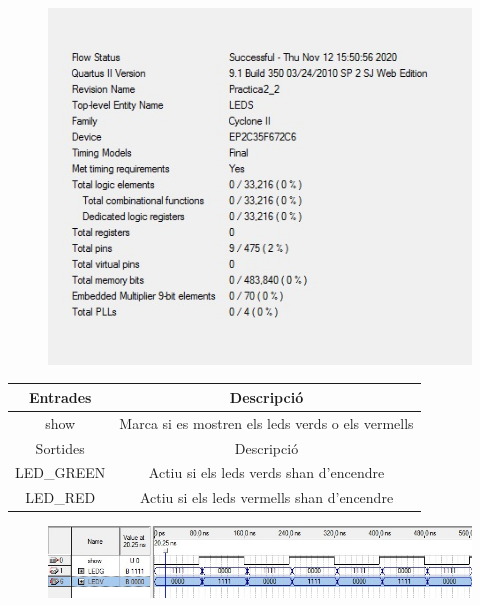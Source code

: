 \documentclass[12pt, a4papre]{article}
\begin{document}
\begin{figure}[H]
		\begin{center}
		\includegraphics[width=130mm]{informeLEDS.jpeg}
		\end{center}
	\end{figure}
	
		\begin{table}[H]
		\centering
		 \begin{tabular}{|c | c|} 
			 \hline
			 Entrades & Descripció\\ [0.5ex] 
			 \hline
			 show & Marca si es mostren els leds verds o els vermells \\ [1ex] 
			 \hline\hline
			 Sortides & Descripció\\ [0.5ex] 
			 \hline
			 LED\_GREEN & Actiu si els leds verds shan d'encendre\\
			LED\_RED & Actiu si els leds vermells shan d'encendre\\ [1ex] 
			 \hline
		 \end{tabular}
	\end{table}
	
	
	\begin{figure}[H]
		\begin{center}
		\includegraphics[width=130mm]{simulLEDS.jpeg}
		\end{center}
	\end{figure}
	
\end{document}
